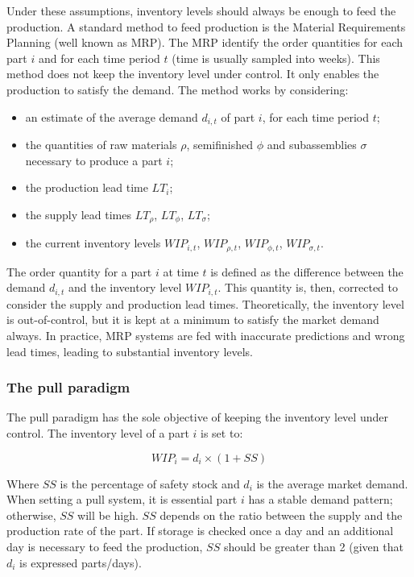 Under these assumptions, inventory levels should always be enough to feed the production. A standard method to feed production is the Material Requirements Planning (well known as MRP). The MRP identify the order quantities for each part $i$ and for each time period $t$ (time is usually sampled into weeks). This method does not keep the inventory level under control. It only enables the production to satisfy the demand. The method works by considering:

\begin{itemize}
    \item an estimate of the average demand $d_{i,t}$ of part $i$, for each time period $t$;
	\item the quantities of raw materials $\rho$, semifinished $\phi$ and subassemblies $\sigma$ necessary to produce a part $i$;
	\item the production lead time $LT_i$;
	\item the supply lead times $LT_\rho$, $LT_\phi$, $LT_\sigma$;
	\item the current inventory levels $WIP_{i,t}$, $WIP_{\rho,t}$, $WIP_{\phi,t}$, $WIP_{\sigma,t}$.

\end{itemize}

The order quantity for a part $i$ at time $t$ is defined as the difference between the demand $d_{i,t}$ and the inventory level $WIP_{i,t}$. This quantity is, then, corrected to consider the supply and production lead times. Theoretically, the inventory level is out-of-control, but it is kept at a minimum to satisfy the market demand always. In practice, MRP systems are fed with inaccurate predictions and wrong lead times, leading to substantial inventory levels. 

\subsubsection{The pull paradigm}
The pull paradigm has the sole objective of keeping the inventory level under control. The inventory level of a part $i$ is set to:

\begin{equation}
    WIP_i=d_i\times(1+SS)
\end{equation}

Where $SS$ is the percentage of safety stock and $d_i$ is the average market demand. When setting a pull system, it is essential part $i$ has a stable demand pattern; otherwise, $SS$ will be high. $SS$ depends on the ratio between the supply and the production rate of the part. If storage is checked once a day and an additional day is necessary to feed the production, $SS$ should be greater than 2 (given that $d_i$ is expressed parts/days).\par

